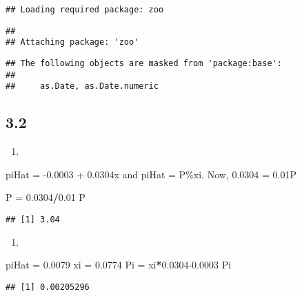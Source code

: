 \documentclass[
]{article}
\newenvironment{Shaded}{\begin{snugshade}}{\end{snugshade}}
\newcommand{\FloatTok}[1]{\textcolor[rgb]{0.00,0.00,0.81}{#1}}
\newcommand{\NormalTok}[1]{#1}
\newcommand{\OperatorTok}[1]{\textcolor[rgb]{0.81,0.36,0.00}{\textbf{#1}}}
\newcommand{\StringTok}[1]{\textcolor[rgb]{0.31,0.60,0.02}{#1}}
\begin{document}
\begin{verbatim}
## Loading required package: zoo
\end{verbatim}

\begin{verbatim}
## 
## Attaching package: 'zoo'
\end{verbatim}

\begin{verbatim}
## The following objects are masked from 'package:base':
## 
##     as.Date, as.Date.numeric
\end{verbatim}

\hypertarget{section}{%
\subsection{3.2}\label{section}}

\begin{enumerate}
\def\labelenumi{\alph{enumi})}
\item
\end{enumerate}

piHat = -0.0003 + 0.0304x and piHat = P\%xi. Now, 0.0304 = 0.01P

\begin{Shaded}
\begin{Highlighting}[]
\NormalTok{P =}\StringTok{ }\FloatTok{0.0304}\OperatorTok{/}\FloatTok{0.01}
\NormalTok{P}
\end{Highlighting}
\end{Shaded}

\begin{verbatim}
## [1] 3.04
\end{verbatim}

\begin{enumerate}
\def\labelenumi{\alph{enumi})}
\setcounter{enumi}{1}
\item
\end{enumerate}

\begin{Shaded}
\begin{Highlighting}[]
\NormalTok{piHat =}\StringTok{ }\FloatTok{0.0079}
\NormalTok{xi =}\StringTok{ }\FloatTok{0.0774}
\NormalTok{Pi =}\StringTok{ }\NormalTok{xi}\OperatorTok{*}\FloatTok{0.0304-0.0003}
\NormalTok{Pi}
\end{Highlighting}
\end{Shaded}

\begin{verbatim}
## [1] 0.00205296
\end{verbatim}
\end{document}
